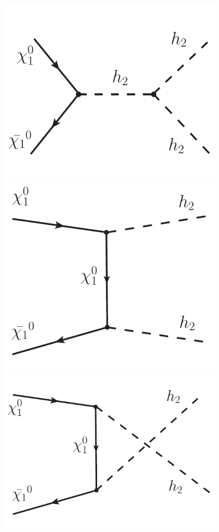 \documentclass[12pt,letterpaper]{article}
\begin{document}
\begin{figure}
\centering
\includegraphics[scale=0.5]{S-channel} \hspace{.5 cm}
\includegraphics[scale=0.5]{T-channel} \hspace{.5 cm}
\includegraphics[scale=0.5]{U-channel}


\end{figure}
\end{document}
